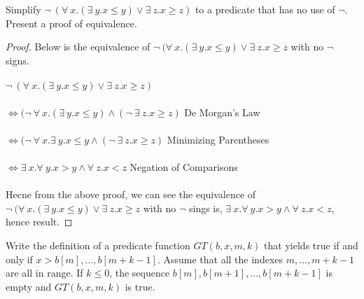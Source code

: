 \documentclass[12pt]{article}
\newenvironment{exercise}[2][Exercise]{\begin{trivlist}
\item[\hskip \labelsep {\bfseries #1}\hskip \labelsep {\bfseries #2.}]}{\end{trivlist}}
\begin{document}
\begin{exercise}{8}
Simplify $\neg\: (\forall\: x.(\exists\: y. x \leq y) \lor \exists\: z. x \geq z)$ to a predicate that has no use of $\neg$. Present a proof of equivalence. 
\end{exercise}

\begin{proof}
Below is the equivalence of $\neg\: (\forall\: x.(\exists\: y. x \leq y) \lor \exists\: z. x \geq z$ with no $\neg$ signs. \\ \\ 
$\neg\: (\forall\: x.(\exists\: y. x \leq y) \lor \exists\: z. x \geq z)$ \\ \\ 
$\Leftrightarrow (\neg\: \forall\: x.(\exists\: y. x \leq y) \land (\neg\: \exists\: z. x \geq z)$ \hfill De Morgan's Law \\ \\
$\Leftrightarrow (\neg\: \forall\: x.\exists\: y. x \leq y \land (\neg\: \exists\: z. x \geq z)$ \hfill Minimizing Parentheses \\ \\ 
$\Leftrightarrow \exists\: x. \forall\: y. x > y \land \forall\: z. x < z$ \hfill Negation of Comparisons \\ \\ 
Hecne from the above proof, we can see the equivalence of $\neg\: (\forall\: x.(\exists\: y. x \leq y) \lor \exists\: z. x \geq z$ with no $\neg$ sings is, $\exists\: x. \forall\: y. x > y \land \forall\: z. x < z$, hence result.

\end{proof}

\begin{exercise}{9}
Write the definition of a predicate function $GT(b,x,m,k)$ that yields true if and only if $x > b[m],...,b[m+k-1]$. Assume that all the indexes $m,...,m+k-1$ are all in range. If $k \leq 0$, the sequence $b[m],b[m+1],...,b[m+k-1]$ is empty and $GT(b,x,m,k)$ is true.
\end{exercise}
\end{document}
